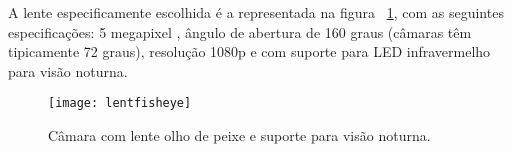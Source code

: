 A lente especificamente escolhida é a representada na figura ~\ref{fig:lentfisheye}, com as seguintes especificações: 5 megapixel , ângulo de abertura de 160 graus (câmaras têm tipicamente 72 graus), resolução 1080p e com suporte para LED infravermelho para visão noturna.

\begin{figure}[h!]%
	\begin{center}
		\leavevmode		
		\texttt{[image: lentfisheye]}
		\caption{Câmara com lente olho de peixe e suporte para visão noturna.}
		\label{fig:lentfisheye}
	\end{center}
\end{figure}

